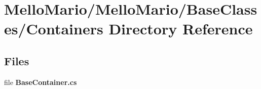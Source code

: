 \section{Mello\+Mario/\+Mello\+Mario/\+Base\+Classes/\+Containers Directory Reference}
\label{dir_55cbbcf68757270991d1ef90835bdcda}
\subsection*{Files}
\begin{DoxyCompactItemize}
\item 
file \textbf{ Base\+Container.\+cs}
\end{DoxyCompactItemize}
